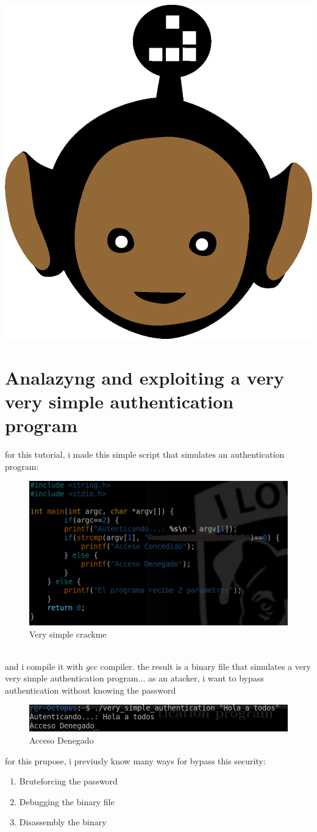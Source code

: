 \documentclass[10pt,a4paper]{article} %
\begin{document}
    \title{\rmfamily\normalfont{}}
    \author{}
    \date{\today}

    \maketitle


    \includegraphics[width=0.1\linewidth]{negro_cara.png}

    \section{Analazyng and exploiting a very very simple
    authentication program}
        for this tutorial, i made this simple script that simulates an
        authentication program:
        \begin{figure}[h!]
            \centering
            \includegraphics[width=0.8\linewidth]{very_simple_crackme.png}
            \caption{Very simple crackme}
            \label{fig:very_simple_crackme}
        \end{figure}
        \\and i compile it with $ gcc  $  compiler. the result is a binary file
        that simulates a very very simple authentication program...  as an
        atacker, i want to bypass authentication without knowing the password
        \begin{figure}[h!]
            \centering
            \includegraphics[width=0.5\linewidth]{accessdenied.png}
            \caption{Acceso Denegado}
            \label{Acceso Denegado}
        \end{figure}
        for this prupose, i previusly know many ways for bypass this security:
        \newpage
        \begin{enumerate}
            \item {Bruteforcing the password}
            \item {Debugging the binary file}
            \item {Disassembly the binary}
        \end{enumerate}
\end{document}
